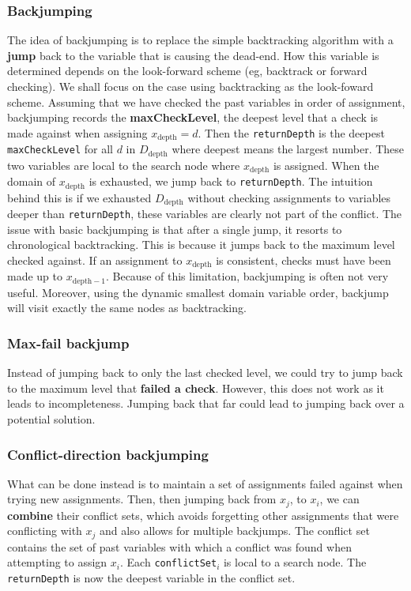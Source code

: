 \documentclass[CS4402-Notes.tex]{subfiles}
\begin{document}
\subsubsection{Backjumping}
The idea of backjumping is to replace the simple backtracking algorithm with a \textbf{jump} back to the variable that is causing the dead-end. How this variable is determined depends on the look-forward scheme (eg, backtrack or forward checking). We shall focus on the case using backtracking as the look-foward scheme.
\n
Assuming that we have checked the past variables in order of assignment, backjumping records the \textbf{maxCheckLevel}, the deepest level that a check is made against when assigning $x_{\text{depth}} = d$. Then the \texttt{returnDepth} is the deepest \texttt{maxCheckLevel} for all $d$ in $D_{\text{depth}}$ where deepest means the largest number. These two variables are local to the search node where $x_{\text{depth}}$ is assigned.
\n
When the domain of $x_{\text{depth}}$ is exhausted, we jump back to \texttt{returnDepth}. The intuition behind this is if we exhausted $D_{\text{depth}}$ without checking assignments to variables deeper than \texttt{returnDepth}, these variables are clearly not part of the conflict.
\n
The issue with basic backjumping is that after a single jump, it resorts to chronological backtracking. This is because it jumps back to the maximum level checked against. If an assignment to $x_{\text{depth}}$ is consistent, checks must have been made up to $x_{\text{depth}-1}$. Because of this limitation, backjumping is often not very useful. Moreover, using the dynamic smallest domain variable order, backjump will visit exactly the same nodes as backtracking.

\subsubsection{Max-fail backjump}
Instead of jumping back to only the last checked level, we could try to jump back to the maximum level that \textbf{failed a check}. However, this does not work as it leads to incompleteness. Jumping back that far could lead to jumping back over a potential solution.

\subsubsection{Conflict-direction backjumping}
What can be done instead is to maintain a set of assignments failed against when trying new assignments. Then, then jumping back from $x_j$, to $x_i$, we can \textbf{combine} their conflict sets, which avoids forgetting other assignments that were conflicting with $x_j$ and also allows for multiple backjumps.
\n
The conflict set contains the set of past variables with which a conflict was found when attempting to assign $x_i$. Each \texttt{conflictSet$_i$} is local to a search node. The \texttt{returnDepth} is now the deepest variable in the conflict set.
\end{document}

